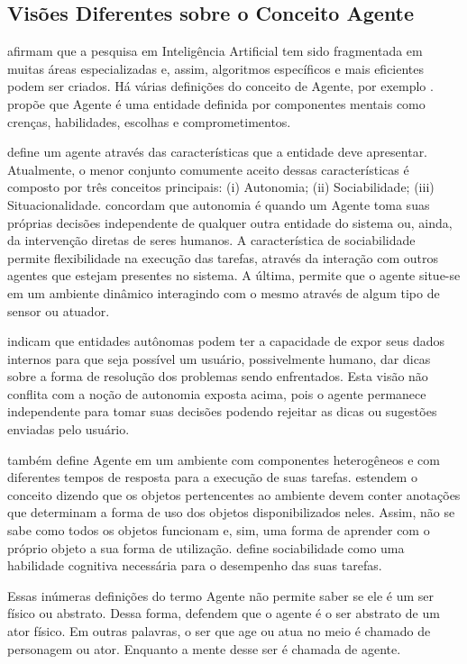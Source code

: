 \subsection{Visões Diferentes sobre o Conceito Agente}

\citet{laird2001human} afirmam que a pesquisa em Inteligência Artificial tem
sido fragmentada em muitas áreas especializadas e, assim, algoritmos
específicos e mais eficientes podem ser criados.
%
Há várias definições do conceito de Agente, por exemplo
\cite{shoham1993agent,roadmap,fatemeh2009multi}. \citet{shoham1993agent}
propõe que Agente é uma entidade definida por componentes mentais como
crenças, habilidades, escolhas e comprometimentos.

\citet{franklin1997agent} define um agente através das características que a
entidade deve apresentar.  Atualmente, o menor conjunto comumente aceito
dessas características é composto por três conceitos principais: (i)
Autonomia; (ii) Sociabilidade; (iii) Situacionalidade.
\citet{roadmap,fatemeh2009multi} concordam que autonomia é quando um Agente
toma suas próprias decisões independente de qualquer outra entidade do sistema
ou, ainda, da intervenção diretas de seres humanos. A característica de
sociabilidade permite flexibilidade na execução das tarefas, através da
interação com outros agentes que estejam presentes no sistema. A última,
permite que o agente situe-se em um ambiente dinâmico interagindo com o mesmo
através de algum tipo de sensor ou atuador.

\citet{ingrand1992architecture} indicam que entidades autônomas podem ter a
capacidade de expor seus dados internos para que seja possível um usuário,
possivelmente humano, dar dicas sobre a forma de resolução dos problemas sendo
enfrentados. Esta visão não conflita com a noção de autonomia exposta acima,
pois o agente permanece independente para tomar suas decisões podendo rejeitar
as dicas ou sugestões enviadas pelo usuário.

\citeauthor{ingrand1992architecture} também define Agente em um ambiente com
componentes heterogêneos e com diferentes tempos de resposta para a execução
de suas tarefas. \citet{doyle1998annotated} estendem o conceito dizendo que os
objetos pertencentes ao ambiente devem conter anotações que determinam a forma
de uso dos objetos disponibilizados neles. Assim, não se sabe como todos os
objetos funcionam e, sim, uma forma de aprender com o próprio objeto a sua
forma de utilização. \citet{shoham1993agent} define sociabilidade como uma
habilidade cognitiva necessária para o desempenho das suas tarefas.

Essas inúmeras definições do termo Agente não permite saber se ele é um ser
físico ou abstrato. Dessa forma, \citet{nareyek2001review,damiano2008emotions}
defendem que o agente é o ser abstrato de um ator físico. Em outras palavras,
o ser que age ou atua no meio é chamado de personagem ou ator. Enquanto a
mente desse ser é chamada de agente.

